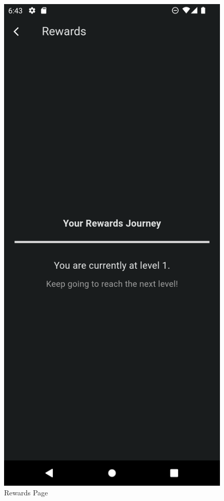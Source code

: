 \documentclass{l4proj}
\begin{document}
\begin{figure}
\begin{minipage}{.5\textwidth}
  \includegraphics[width=.6\linewidth]{images/Rewards1.png}

  \caption{Rewards Page}
    \label{fig:Rewards}
\end{minipage}
\end{figure}


\end{document}

